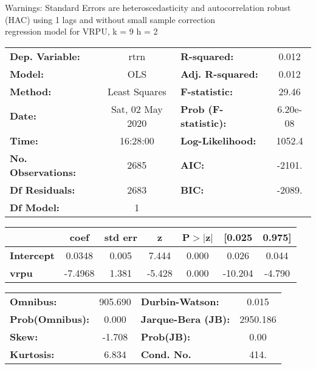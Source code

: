 Warnings: \newline
 [1] Standard Errors are heteroscedasticity and autocorrelation robust (HAC) using 1 lags and without small sample correction\\ 

regression model for VRPU, k = 9 h = 2\begin{center}
\begin{tabular}{lclc}
\toprule
\textbf{Dep. Variable:}    &       rtrn       & \textbf{  R-squared:         } &     0.012   \\
\textbf{Model:}            &       OLS        & \textbf{  Adj. R-squared:    } &     0.012   \\
\textbf{Method:}           &  Least Squares   & \textbf{  F-statistic:       } &     29.46   \\
\textbf{Date:}             & Sat, 02 May 2020 & \textbf{  Prob (F-statistic):} &  6.20e-08   \\
\textbf{Time:}             &     16:28:00     & \textbf{  Log-Likelihood:    } &    1052.4   \\
\textbf{No. Observations:} &        2685      & \textbf{  AIC:               } &    -2101.   \\
\textbf{Df Residuals:}     &        2683      & \textbf{  BIC:               } &    -2089.   \\
\textbf{Df Model:}         &           1      & \textbf{                     } &             \\
\bottomrule
\end{tabular}
\begin{tabular}{lcccccc}
                   & \textbf{coef} & \textbf{std err} & \textbf{z} & \textbf{P$> |$z$|$} & \textbf{[0.025} & \textbf{0.975]}  \\
\midrule
\textbf{Intercept} &       0.0348  &        0.005     &     7.444  &         0.000        &        0.026    &        0.044     \\
\textbf{vrpu}      &      -7.4968  &        1.381     &    -5.428  &         0.000        &      -10.204    &       -4.790     \\
\bottomrule
\end{tabular}
\begin{tabular}{lclc}
\textbf{Omnibus:}       & 905.690 & \textbf{  Durbin-Watson:     } &    0.015  \\
\textbf{Prob(Omnibus):} &   0.000 & \textbf{  Jarque-Bera (JB):  } & 2950.186  \\
\textbf{Skew:}          &  -1.708 & \textbf{  Prob(JB):          } &     0.00  \\
\textbf{Kurtosis:}      &   6.834 & \textbf{  Cond. No.          } &     414.  \\
\bottomrule
\end{tabular}
\end{center}

